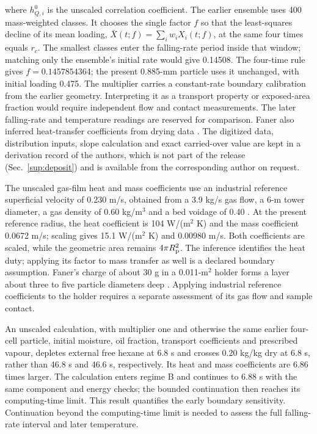 where $h^0_{Q,i}$ is the unscaled correlation coefficient.
The earlier ensemble uses 400 mass-weighted classes. It chooses the
single factor $f$ so that the least-squares decline of its mean loading,
$\bar X(t;f)=\sum_i w_iX_i(t;f)$, at the same four times equals $r_c$.
The smallest classes enter the falling-rate period inside that window;
matching only the ensemble's initial rate would give 0.14508.
The four-time rule gives $f=0.1457854364$; the present 0.885-mm particle
uses it unchanged, with initial loading 0.475.
The multiplier carries a constant-rate boundary calibration from the
earlier geometry. Interpreting it as a transport property or exposed-area
fraction would require independent flow and contact measurements. The later
falling-rate and temperature readings are reserved for comparison. Faner also inferred heat-transfer coefficients
from drying data \citep{faner2019kinetics}.
The digitized data, distribution inputs, slope calculation and exact
carried-over value are kept in a derivation record of the authors, which
is not part of the release (Sec.~\ref{sup:deposit}) and is available from
the corresponding author on request.

The unscaled gas-film heat and mass coefficients use an industrial
reference superficial velocity of 0.230 m/s, obtained from a 3.9 kg/s gas
flow, a 6-m tower diameter, a gas density of 0.60 kg/m$^3$ and a bed voidage
of 0.40 \citep{coletto2022modeling}. At the present reference radius, the
heat coefficient is 104 W/(m$^2$ K) and the mass coefficient 0.0672 m/s;
scaling gives 15.1 W/(m$^2$ K) and 0.00980 m/s. Both coefficients
are scaled, while the geometric area remains $4\pi R_{\mathrm{p}}^2$.
The inference identifies the heat duty; applying its factor to mass
transfer as well is a declared boundary assumption.
Faner's charge of about 30 g in a 0.011-m$^2$ holder forms a layer
about three to five particle diameters deep \citep{faner2019kinetics}.
Applying industrial reference coefficients to the holder requires a
separate assessment of its gas flow and sample contact.

An unscaled calculation, with multiplier one and otherwise the same
earlier four-cell particle, initial moisture, oil fraction, transport coefficients
and prescribed vapour, depletes external free hexane at 6.8 s and crosses
0.20 kg/kg dry at 6.8 s, rather than 46.8 s and 46.6 s, respectively.
Its heat and mass coefficients are 6.86 times larger. The calculation
enters regime B and continues to 6.88 s with the same component
and energy checks; the bounded continuation then reaches its computing-time
limit. This result quantifies the early boundary sensitivity. Continuation
beyond the computing-time limit is needed to assess the full falling-rate
interval and later temperature.

